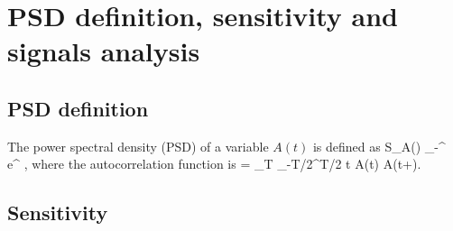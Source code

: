 \documentclass[twocolumn,superscriptaddress,floatfix,preprintnumbers,prl]{revtex4}
\begin{document}
\section{PSD definition, sensitivity and signals analysis}

\subsection{PSD definition}

The power spectral density (PSD) of a variable $A(t)$ is defined as
\be
S_A(\w) \equiv {} \int_{-\infty}^\infty  {} e^{\im \w \tau}  \tau,
\ee
where the autocorrelation function is
\be
  = \lim_{T \rightarrow \infty}  \int_{-T/2}^{T/2} t A(t) A(t+\tau).
\ee

\subsection{Sensitivity}
\end{document}
